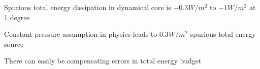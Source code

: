 \documentclass[draft,linenumbers]{agujournal}
\begin{document}






 \begin{keypoints}
 \item Spurious total energy dissipation in dynamical core is $-0.3W/m^2$ to $-1W/m^2$ at 1 degree
 \item Constant-pressure assumption in physics leads to $0.3W/m^2$ spurious total energy source
 \item There can easily be compensating errors in total energy budget

%


 \end{keypoints}
\end{document}
